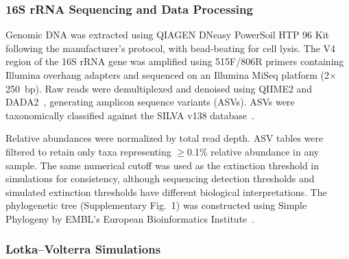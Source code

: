 \subsubsection*{16S rRNA Sequencing and Data Processing}
\label{sec:suppl:methods:sequencing}

Genomic DNA was extracted using QIAGEN DNeasy PowerSoil HTP 96 Kit following the manufacturer's protocol, with bead-beating for cell lysis. The V4 region of the 16S rRNA gene was amplified using 515F/806R primers containing Illumina overhang adapters and sequenced on an Illumina MiSeq platform (2$\times$250~bp). Raw reads were demultiplexed and denoised using QIIME2 and DADA2~\citep{Callahan2016}, generating amplicon sequence variants (ASVs). ASVs were taxonomically classified against the SILVA v138 database~\citep{Quast2013}.

Relative abundances were normalized by total read depth. ASV tables were filtered to retain only taxa representing $\geq$0.1\% relative abundance in any sample. The same numerical cutoff was used as the extinction threshold in simulations for consistency, although sequencing detection thresholds and simulated extinction thresholds have different biological interpretations. The phylogenetic tree (Supplementary Fig.~1) was constructed using Simple Phylogeny by EMBL's European Bioinformatics Institute~\citep{Madeira2022}.


\subsubsection*{Lotka--Volterra Simulations}
\label{sec:suppl:methods:simulations}

